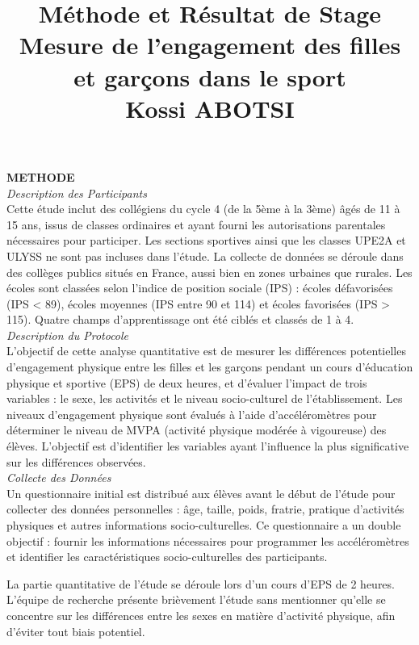 \documentclass[12pt,a4paper]{article}
\title{
	\textbf{Méthode et Résultat de Stage}\\[0.5cm]
	\textbf{Mesure de l'engagement des filles et garçons dans le sport}\\
	\vspace{2cm}
	\textbf{Kossi ABOTSI}\\
}
\begin{document}
	\maketitle
	\textbf{METHODE}\\
	
	\textit{Description des Participants}\\
	Cette étude inclut des collégiens du cycle 4 (de la 5ème à la 3ème) âgés de 11 à 15 ans, issus de classes ordinaires et ayant fourni les autorisations parentales nécessaires pour participer. Les sections sportives ainsi que les classes UPE2A et ULYSS ne sont pas incluses dans l’étude. La collecte de données se déroule dans des collèges publics situés en France, aussi bien en zones urbaines que rurales. Les écoles sont classées selon l’indice de position sociale (IPS) : écoles défavorisées (IPS < 89), écoles moyennes (IPS entre 90 et 114) et écoles favorisées (IPS > 115). Quatre champs d'apprentissage ont été ciblés et classés de 1 à 4.\\
	
	\textit{Description du Protocole}\\
	L'objectif de cette analyse quantitative est de mesurer les différences potentielles d’engagement physique entre les filles et les garçons pendant un cours d’éducation physique et sportive (EPS) de deux heures, et d'évaluer l'impact de trois variables : le sexe, les activités et le niveau socio-culturel de l’établissement. Les niveaux d'engagement physique sont évalués à l'aide d'accéléromètres pour déterminer le niveau de MVPA (activité physique modérée à vigoureuse) des élèves. L'objectif est d'identifier les variables ayant l'influence la plus significative sur les différences observées.\\
	
	\textit{Collecte des Données}\\
	Un questionnaire initial est distribué aux élèves avant le début de l’étude pour collecter des données personnelles : âge, taille, poids, fratrie, pratique d’activités physiques et autres informations socio-culturelles. Ce questionnaire a un double objectif : fournir les informations nécessaires pour programmer les accéléromètres et identifier les caractéristiques socio-culturelles des participants.
	
	La partie quantitative de l’étude se déroule lors d’un cours d’EPS de 2 heures. L’équipe de recherche présente brièvement l'étude sans mentionner qu'elle se concentre sur les différences entre les sexes en matière d'activité physique, afin d'éviter tout biais potentiel.
	
\end{document}
